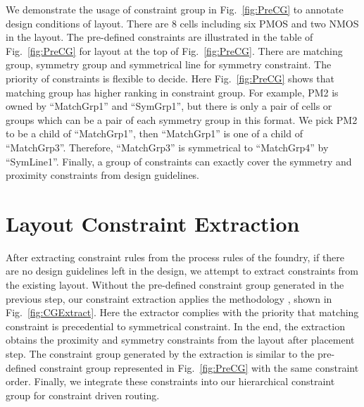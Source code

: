   
    We demonstrate the usage of constraint group in Fig.~\ref{fig:PreCG} to annotate design conditions of layout. There are 8 cells including six PMOS and two NMOS in the layout. The pre-defined constraints are illustrated in the table of Fig.~\ref{fig:PreCG} for layout at the top of Fig.~\ref{fig:PreCG}. There are matching group, symmetry group and symmetrical line for symmetry constraint. The priority of constraints is flexible to decide. Here Fig.~\ref{fig:PreCG} shows that matching group has higher ranking in constraint group. For example, PM2 is owned by ``MatchGrp1'' and ``SymGrp1'', but there is only a pair of cells or groups which can be a pair of each symmetry group in this format. We pick PM2 to be a child of  ``MatchGrp1'', then ``MatchGrp1'' is one of a child of ``MatchGrp3''. Therefore, ``MatchGrp3'' is symmetrical to ``MatchGrp4'' by ``SymLine1''. Finally, a group of constraints can exactly cover the symmetry and proximity constraints from design guidelines.


  \section{Layout Constraint Extraction}\label{sec:LayoutConExt}
    After extracting constraint rules from the process rules of the foundry, if there are no design guidelines left in the design, we attempt to extract constraints from the existing layout. Without the pre-defined constraint group generated in the previous step, our constraint extraction applies the methodology \cite{srm-massier-tcad08,palpndg-iccad2011}, shown in Fig.~\ref{fig:CGExtract}. Here the extractor complies with the priority that matching constraint is precedential to symmetrical constraint. In the end, the extraction obtains the proximity and symmetry constraints from the layout after placement step. The constraint group generated by the extraction is similar to the pre-defined constraint group represented in Fig.~\ref{fig:PreCG} with the same constraint order. Finally, we integrate these constraints into our hierarchical constraint group for constraint driven routing.
  
